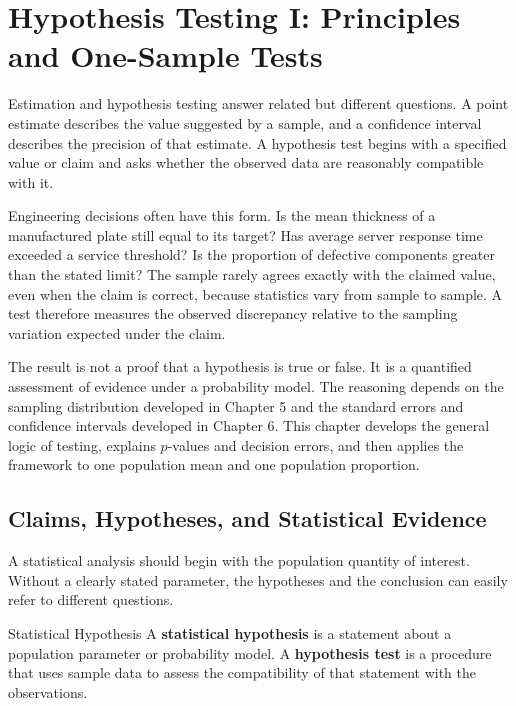 \chapter{Hypothesis Testing I: Principles and One-Sample Tests}
\label{ch:hypothesis-testing-one-sample}

Estimation and hypothesis testing answer related but different questions. A point estimate describes the value suggested by a sample, and a confidence interval describes the precision of that estimate. A hypothesis test begins with a specified value or claim and asks whether the observed data are reasonably compatible with it.

Engineering decisions often have this form. Is the mean thickness of a manufactured plate still equal to its target? Has average server response time exceeded a service threshold? Is the proportion of defective components greater than the stated limit? The sample rarely agrees exactly with the claimed value, even when the claim is correct, because statistics vary from sample to sample. A test therefore measures the observed discrepancy relative to the sampling variation expected under the claim.

The result is not a proof that a hypothesis is true or false. It is a quantified assessment of evidence under a probability model. The reasoning depends on the sampling distribution developed in Chapter 5 and the standard errors and confidence intervals developed in Chapter 6. This chapter develops the general logic of testing, explains $p$-values and decision errors, and then applies the framework to one population mean and one population proportion.

\section{Claims, Hypotheses, and Statistical Evidence}
\label{sec:hypotheses-evidence}

A statistical analysis should begin with the population quantity of interest. Without a clearly stated parameter, the hypotheses and the conclusion can easily refer to different questions.

\begin{definition}{Statistical Hypothesis}
A \textbf{statistical hypothesis} is a statement about a population parameter or probability model. A \textbf{hypothesis test} is a procedure that uses sample data to assess the compatibility of that statement with the observations.
\end{definition}

